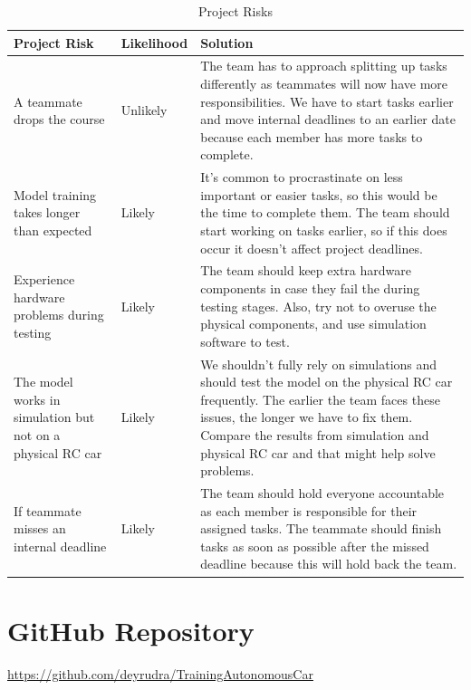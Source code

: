 \documentclass{article} %
\begin{document}
\begin{table}[H]
\caption{Project Risks}
\centering
\begin{tabular}{|p{4cm}|p{2.5cm}|p{7cm}|}
\hline
\textbf{Project Risk} & \textbf{Likelihood} & \textbf{Solution} \\ \hline
A teammate drops the course & Unlikely & The team has to approach splitting up tasks differently as teammates will now have more responsibilities. We have to start tasks earlier and move internal deadlines to an earlier date because each member has more tasks to complete. \\ \hline
Model training takes longer than expected & Likely & It’s common to procrastinate on less important or easier tasks, so this would be the time to complete them. The team should start working on tasks earlier, so if this does occur it doesn’t affect project deadlines. \\ \hline
Experience hardware problems during testing & Likely & The team should keep extra hardware components in case they fail the during testing stages. Also, try not to overuse the physical components, and use simulation software to test. \\ \hline
The model works in simulation but not on a physical RC car & Likely & We shouldn’t fully rely on simulations and should test the model on the physical RC car frequently. The earlier the team faces these issues, the longer we have to fix them. Compare the results from simulation and physical RC car and that might help solve problems. \\ \hline
If teammate misses an internal deadline & Likely & The team should hold everyone accountable as each member is responsible for their assigned tasks. The teammate should finish tasks as soon as possible after the missed deadline because this will hold back the team. \\ \hline
\end{tabular}
\end{table}

\section{GitHub Repository}
\url{https://github.com/deyrudra/TrainingAutonomousCar}

\label{last_page}



\end{document}
